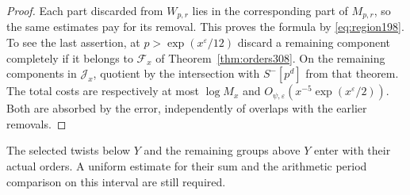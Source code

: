 \documentclass[a4paper,11pt]{article}
\theoremstyle{definition}
\theoremstyle{remark}
\numberwithin{equation}{section}
\begin{document}
\begin{proof}
Each part discarded from \(W_{p,r}\) lies in the corresponding
part of \(M_{p,r}\), so the same estimates pay for its removal.
This proves the formula by \eqref{eq:region198}. To see the last
assertion, at \(p>\exp(x^\varepsilon/12)\) discard a remaining
component completely if it belongs to \(\mathcal F_x\) of
Theorem~\ref{thm:orders308}. On the remaining components in
\(\mathcal J_x\), quotient by the intersection with \(S^-[p^d]\)
from that theorem. The total costs are respectively at most
\(\log M_x\) and \(O_{\psi,\varepsilon}(x^{-5}\exp(x^\varepsilon/2))\).
Both are absorbed by the error, independently of overlaps
with the earlier removals.
\end{proof}

The selected twists below \(Y\) and the remaining groups above
\(Y\) enter with their actual orders. A uniform estimate for
their sum and the arithmetic period comparison on this interval
are still required.
\end{document}
